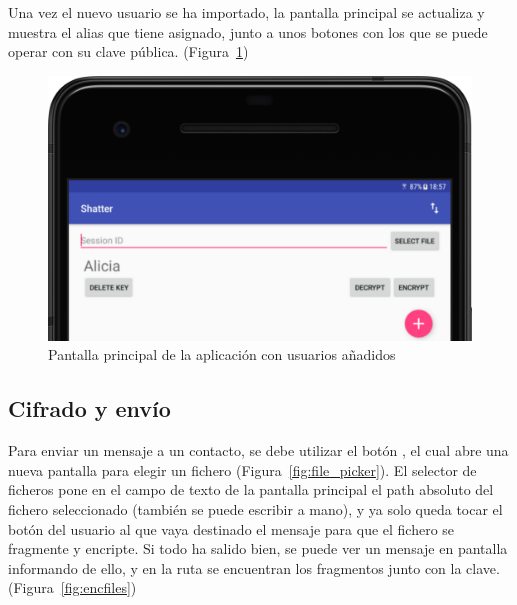 
Una vez el nuevo usuario se ha importado, la pantalla principal se actualiza y muestra el alias que tiene asignado, junto a unos botones con los que se puede operar con su clave pública. (Figura~\ref{fig:home_2})

\begin{figure}[!htb]
  \centering
  \includegraphics[scale=0.4]{Figures/home_2}
  \decoRule
  \caption[Shatter (Pantalla principal con usuarios)]{Pantalla principal de la aplicación con usuarios añadidos}
  \label{fig:home_2}
\end{figure}

\subsection{Cifrado y envío}

Para enviar un mensaje a un contacto, se debe utilizar el botón , el cual abre una nueva pantalla para elegir un fichero (Figura~\ref{fig:file_picker}). El selector de ficheros pone en el campo de texto de la pantalla principal el path absoluto del fichero seleccionado (también se puede escribir a mano), y ya solo queda tocar el botón  del usuario al que vaya destinado el mensaje para que el fichero se fragmente y encripte. Si todo ha salido bien, se puede ver un mensaje en pantalla informando de ello, y en la ruta  se encuentran los fragmentos junto con la clave. (Figura~\ref{fig:encfiles})

